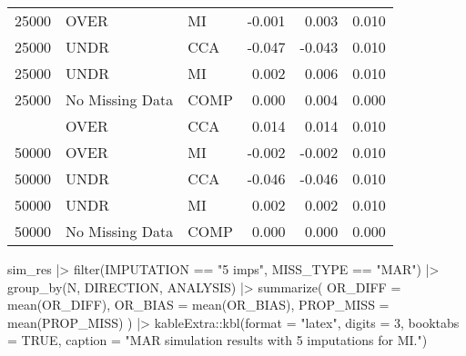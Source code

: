 \documentclass[
  letterpaper,
  DIV=11,
  numbers=noendperiod]{scrartcl}
\newenvironment{Shaded}{\begin{snugshade}}{\end{snugshade}}
\newcommand{\AttributeTok}[1]{\textcolor[rgb]{0.40,0.45,0.13}{#1}}
\newcommand{\ConstantTok}[1]{\textcolor[rgb]{0.56,0.35,0.01}{#1}}
\newcommand{\DecValTok}[1]{\textcolor[rgb]{0.68,0.00,0.00}{#1}}
\newcommand{\FunctionTok}[1]{\textcolor[rgb]{0.28,0.35,0.67}{#1}}
\newcommand{\NormalTok}[1]{\textcolor[rgb]{0.00,0.23,0.31}{#1}}
\newcommand{\SpecialCharTok}[1]{\textcolor[rgb]{0.37,0.37,0.37}{#1}}
\newcommand{\StringTok}[1]{\textcolor[rgb]{0.13,0.47,0.30}{#1}}
\begin{document}
\begin{table}
\begin{tabular}[t]{rllrrr}
25000 & OVER & MI & -0.001 & 0.003 & 0.010\\
25000 & UNDR & CCA & -0.047 & -0.043 & 0.010\\
25000 & UNDR & MI & 0.002 & 0.006 & 0.010\\
25000 & No Missing Data & COMP & 0.000 & 0.004 & 0.000\\
\addlinespace
50000 & OVER & CCA & 0.014 & 0.014 & 0.010\\
50000 & OVER & MI & -0.002 & -0.002 & 0.010\\
50000 & UNDR & CCA & -0.046 & -0.046 & 0.010\\
50000 & UNDR & MI & 0.002 & 0.002 & 0.010\\
50000 & No Missing Data & COMP & 0.000 & 0.000 & 0.000\\
\bottomrule
\end{tabular}
\end{table}

\begin{Shaded}
\begin{Highlighting}[]
\NormalTok{sim\_res }\SpecialCharTok{|\textgreater{}} 
  \FunctionTok{filter}\NormalTok{(IMPUTATION }\SpecialCharTok{==} \StringTok{"5 imps"}\NormalTok{, }
\NormalTok{         MISS\_TYPE }\SpecialCharTok{==} \StringTok{"MAR"}\NormalTok{) }\SpecialCharTok{|\textgreater{}}
  \FunctionTok{group\_by}\NormalTok{(N, DIRECTION, ANALYSIS) }\SpecialCharTok{|\textgreater{}}
  \FunctionTok{summarize}\NormalTok{(}
    \AttributeTok{OR\_DIFF =} \FunctionTok{mean}\NormalTok{(OR\_DIFF),}
    \AttributeTok{OR\_BIAS =} \FunctionTok{mean}\NormalTok{(OR\_BIAS),}
    \AttributeTok{PROP\_MISS =} \FunctionTok{mean}\NormalTok{(PROP\_MISS)}
\NormalTok{  ) }\SpecialCharTok{|\textgreater{}} 
\NormalTok{  kableExtra}\SpecialCharTok{::}\FunctionTok{kbl}\NormalTok{(}\AttributeTok{format =} \StringTok{"latex"}\NormalTok{, }
                  \AttributeTok{digits =} \DecValTok{3}\NormalTok{, }
                  \AttributeTok{booktabs =} \ConstantTok{TRUE}\NormalTok{,}
                  \AttributeTok{caption =} \StringTok{"MAR simulation results with 5 imputations for MI."}\NormalTok{)}
\end{Highlighting}
\end{Shaded}
\end{document}
